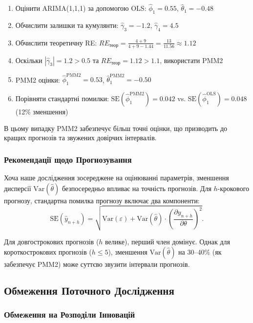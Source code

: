 \documentclass[12pt,a4paper]{article}
\begin{document}
\begin{enumerate}
    \item Оцінити ARIMA(1,1,1) за допомогою OLS: $\hat{\phi}_1 = 0.55$, $\hat{\theta}_1 = -0.48$
    \item Обчислити залишки та кумулянти: $\hat{\gamma}_3 = -1.2$, $\hat{\gamma}_4 = 4.5$
    \item Обчислити теоретичну RE: $RE_{\text{теор}} = \frac{4 + 9}{4 + 9 - 1.44} = \frac{13}{11.56} \approx 1.12$
    \item Оскільки $|\hat{\gamma}_3| = 1.2 > 0.5$ та $RE_{\text{теор}} = 1.12 > 1.1$, використати PMM2
    \item PMM2 оцінки: $\hat{\phi}_1^{\text{PMM2}} = 0.53$, $\hat{\theta}_1^{\text{PMM2}} = -0.50$
    \item Порівняти стандартні помилки: $\text{SE}(\hat{\phi}_1^{\text{PMM2}}) = 0.042$ vs. $\text{SE}(\hat{\phi}_1^{\text{OLS}}) = 0.048$ (12\% зменшення)
\end{enumerate}

В цьому випадку PMM2 забезпечує більш точні оцінки, що призводить до кращих прогнозів та звужених довірчих інтервалів.

\subsubsection{Рекомендації щодо Прогнозування}

Хоча наше дослідження зосереджене на оцінюванні параметрів, зменшення дисперсії $\text{Var}(\hat{\theta})$ безпосередньо впливає на точність прогнозів. Для $h$-крокового прогнозу, стандартна помилка прогнозу включає два компоненти:
\begin{equation}
    \text{SE}(\hat{y}_{n+h}) = \sqrt{\text{Var}(\varepsilon) + \text{Var}(\hat{\theta}) \cdot \left(\frac{\partial y_{n+h}}{\partial \theta}\right)^2}.
\end{equation}

Для довгострокових прогнозів ($h$ велике), перший член домінує. Однак для короткострокових прогнозів ($h \leq 5$), зменшення $\text{Var}(\hat{\theta})$ на 30--40\% (як забезпечує PMM2) може суттєво звузити інтервали прогнозів.

\subsection{Обмеження Поточного Дослідження}
\label{subsec:limitations}

\subsubsection{Обмеження на Розподіли Інновацій}
\end{document}
